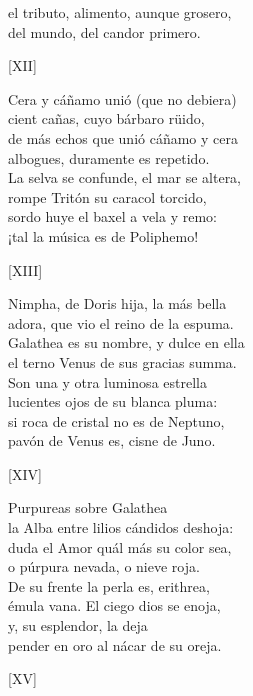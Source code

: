 \documentclass[11pt,a4paper,twoside]{article}
\begin{document}
el tributo, alimento, aunque grosero,\\
del  mundo, del candor primero.\par\pend
\relax
\vfill
\newpage
%
\begin{center}
	[XII]
\end{center}\pstart
Cera y cáñamo unió (que no debiera)\\
cient cañas, cuyo bárbaro rüido,\\
de más echos que unió cáñamo y cera\\
albogues, duramente es repetido.\\
La selva se confunde, el mar se altera,\\
rompe Tritón su caracol torcido,\\
sordo huye el baxel a vela y remo:\\
¡tal la música es de Poliphemo!\par\pend
%
\begin{center}
	[XIII]
\end{center}\pstart
Nimpha, de Doris hija, la más bella\\
adora, que vio el reino de la espuma.\\
Galathea es su nombre, y dulce en ella\\
el terno Venus de sus gracias summa.\\
Son una y otra luminosa estrella\\
lucientes ojos de su blanca pluma:\\
si roca de cristal no es de Neptuno,\\
pavón de Venus es, cisne de Juno.\par\pend 
%
\begin{center}
	[XIV]
\end{center}\pstart
Purpureas  sobre Galathea\\
la Alba entre lilios cándidos deshoja:\\
duda el Amor quál más su color sea,\\
o púrpura nevada, o nieve roja.\\
De su frente la perla es, erithrea,\\
émula vana. El ciego dios se enoja,\\
y,  su esplendor, la deja\\
pender en oro al nácar de su oreja.\par\pend
%
\begin{center}
	[XV]
\end{center}\pstart
\end{document}
